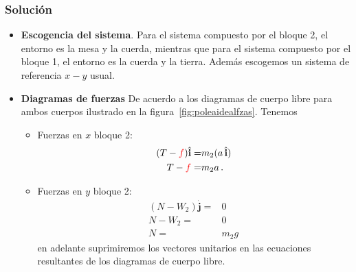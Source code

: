 \subsubsection*{Solución}
\begin{frame}
\begin{itemize}
\item  \textbf{Escogencia del sistema}. Para el sistema compuesto por el bloque 2, el entorno es la mesa y la cuerda, mientras que para el sistema compuesto por el bloque 1, el entorno es la cuerda y la tierra. Además escogemos un sistema de referencia $x-y$ usual. 

\item \textbf{Diagramas de fuerzas} De acuerdo a los diagramas de cuerpo libre para ambos cuerpos ilustrado en la figura~\ref{fig:poleaidealfzas}. Tenemos
  \begin{itemize}
  \item Fuerzas en $x$ bloque 2:
  \begin{align}
    \label{eq:pi1}
    (T-{\color{red}f})\hat{\mathbf{i}}=&m_2 (a\,\hat{\mathbf{i}})\nonumber\\
    T-{\color{red}f}=&m_2 a\,.
  \end{align}
  \item Fuerzas en $y$ bloque 2:
  \begin{align}
    (N-W_2)\hat{\mathbf{j}}=&0\nonumber\\
    N-W_2=&0\nonumber\\
    N=&m_2 g\,
  \end{align}
  en adelante suprimiremos los vectores unitarios en las ecuaciones
  resultantes de los diagramas de cuerpo libre.


\end{itemize}
\end{itemize}
\end{frame}
